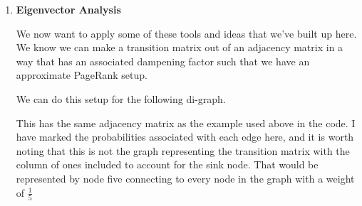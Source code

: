 \documentclass[11pt]{article}
\begin{document}
\begin{enumerate}
    \item \textbf{Eigenvector Analysis}

        We now want to apply some of these tools and ideas that we've built
        up here. We know we can make a transition matrix out of an adjacency
        matrix in a way that has an associated dampening factor such that we
        have an approximate PageRank setup.

        We can do this setup for the following di-graph.

        \begin{center}
        \end{center}
        This has the same adjacency matrix as the example used above in the
        code. I have marked the probabilities associated with each edge here,
        and it is worth noting that this is not the graph representing the
        transition matrix with the column of ones included to account for the
        sink node. That would be represented by node five connecting to every
        node in the graph with a weight of $\frac{1}{5}$


\end{enumerate}
\end{document}
